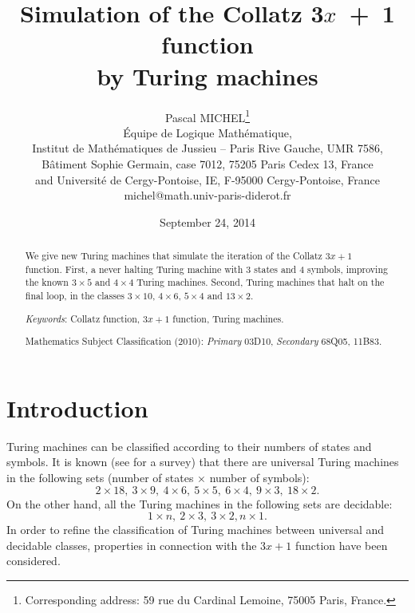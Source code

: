 \documentclass[10pt]{article}
\title{Simulation of the Collatz 3$x$\ +\ 1 function\\ by Turing machines}
\author{Pascal MICHEL\thanks{Corresponding address: 59 rue du Cardinal Lemoine,
75005 Paris, France.}\\
{\small \'Equipe de Logique Math\'ematique,}\\
{\small Institut de Math\'ematiques de Jussieu -- Paris Rive Gauche, UMR 7586,}\\
{\small B\^atiment Sophie Germain, case 7012, 75205 Paris Cedex 13, France}\\
{\small and Universit\'e de Cergy-Pontoise, IE, F-95000 Cergy-Pontoise, France}\\
{\small michel@math.univ-paris-diderot.fr}}
\date{September 24, 2014}
\begin{document}
\maketitle

\begin{abstract}
We give new Turing machines that simulate the iteration of the Collatz
$3x+1$ function. First, a never halting Turing machine with 3 states and
4 symbols, improving the known $3 \times 5$ and $4 \times 4$ Turing machines.
Second, Turing machines that halt on the final loop, in the classes $3 \times 10$,
$4 \times 6$, $5 \times 4$ and $13 \times 2$.

\bigskip

\noindent\emph{Keywords}: Collatz function, $3x+1$ function, Turing machines.

\bigskip

\noindent Mathematics Subject Classification (2010):
\emph{Primary} 03D10, \emph{Secondary} 68Q05, 11B83.
\end{abstract}

\section{Introduction}
Turing machines can be classified according to their numbers of states and symbols.
It is known (see \cite{WN09} for a survey) that there are universal Turing 
machines in the following sets (number of states $\times$ number of symbols):
$$2 \times 18,\ 3 \times 9,\ 4 \times 6,\ 5 \times 5,\ 6 \times 4,\ 9 \times 3,\ 18 \times 2.$$
On the other hand, all the Turing machines in the following sets are decidable:
$$1 \times n,\ 2 \times 3,\ 3 \times 2, n \times 1.$$
In order to refine the classification of Turing machines between universal and decidable classes,
properties in connection with the $3x + 1$ function have been considered.
\end{document}
